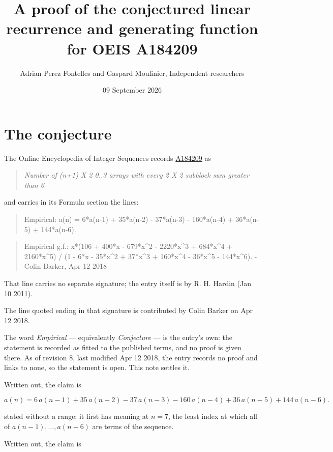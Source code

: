 \documentclass[11pt]{article}
\title{A proof of the conjectured linear recurrence and generating function for OEIS A184209}
\author{Adrian Perez Fontelles and Gaspard Moulinier, Independent researchers}
\date{09 September 2026}
\theoremstyle{definition}
\begin{document}
\maketitle
\section{The conjecture}

The Online Encyclopedia of Integer Sequences records \href{https://oeis.org/A184209}{A184209} as

\begin{quote}\itshape Number of (n+1) X 2 0..3 arrays with every 2 X 2 subblock sum greater than 6\end{quote}

and carries in its Formula section the lines:

\begin{quote}\ttfamily Empirical: a(n) = 6*a(n-1) + 35*a(n-2) - 37*a(n-3) - 160*a(n-4) + 36*a(n-5) + 144*a(n-6).\end{quote}

\begin{quote}\ttfamily Empirical g.f.: x*(106 + 400*x - 679*x\textasciicircum{}2 - 2220*x\textasciicircum{}3 + 684*x\textasciicircum{}4 + 2160*x\textasciicircum{}5) / (1 - 6*x - 35*x\textasciicircum{}2 + 37*x\textasciicircum{}3 + 160*x\textasciicircum{}4 - 36*x\textasciicircum{}5 - 144*x\textasciicircum{}6). - Colin Barker, Apr 12 2018\end{quote}

That line carries no separate signature; the entry itself is by R. H. Hardin (Jan 10 2011).

The line quoted ending in that signature is contributed by Colin Barker on Apr 12 2018.

The word {\itshape Empirical} --- equivalently {\itshape Conjecture} --- is the entry's own: the statement is recorded as fitted to the published terms, and no proof is given there. As of revision 8, last modified Apr 12 2018, the entry records no proof and links to none, so the statement is open. This note settles it.

Written out, the claim is

\[a(n) = 6\,a(n-1) + 35\,a(n-2) - 37\,a(n-3) - 160\,a(n-4) + 36\,a(n-5) + 144\,a(n-6).\]

stated without a range; it first has meaning at $n = 7$, the least index at which all of $a(n-1),\dots,a(n-6)$ are terms of the sequence.

Written out, the claim is
\end{document}
